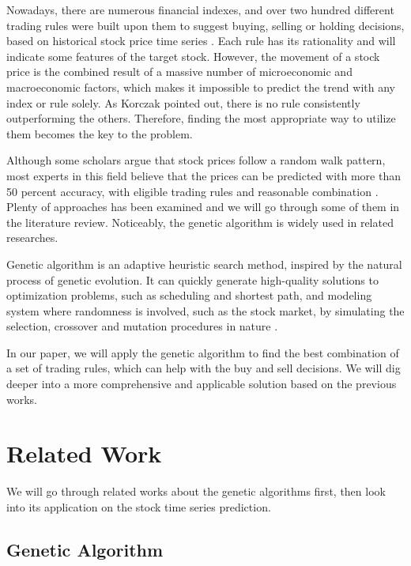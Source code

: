 \documentclass{article}
\begin{document}
Nowadays, there are numerous financial indexes, and over two hundred different trading rules were
built upon them to suggest buying, selling or holding decisions,
based on historical stock price time series \cite{stock-timing-using-genetic-algorithms}.
Each rule has its rationality and will indicate some features of the target stock.
However, the movement of a stock price is the combined result of a massive number of microeconomic and macroeconomic factors,
which makes it impossible to predict the trend with any index or rule solely.
As Korczak \cite{stock-timing-using-genetic-algorithms} pointed out,
there is no rule consistently outperforming the others.
Therefore, finding the most appropriate way to utilize them becomes the key to the problem.

Although some scholars argue that stock prices follow a random walk pattern,
most experts in this field believe that the prices can be predicted with more than 50 percent accuracy,
with eligible trading rules and reasonable combination \cite{stock-market-prediction-with-multiple-classifiers}.
Plenty of approaches has been examined and we will go through some of them in the literature review.
Noticeably, the genetic algorithm is widely used in related researches.

Genetic algorithm is an adaptive heuristic search method,
inspired by the natural process of genetic evolution.
It can quickly generate high-quality solutions to optimization problems, such as scheduling and shortest path,
and modeling system where randomness is involved, such as the stock market,
by simulating the selection, crossover and mutation procedures in nature
\cite{genetic-algorithm-review-and-application}.

In our paper, we will apply the genetic algorithm to
find the best combination of a set of trading rules, which can help with the buy and sell decisions.
We will dig deeper into a more comprehensive and applicable solution based on the previous works.

\section{Related Work}

We will go through related works about the genetic algorithms first,
then look into its application on the stock time series prediction.

\subsection{Genetic Algorithm}
\end{document}
